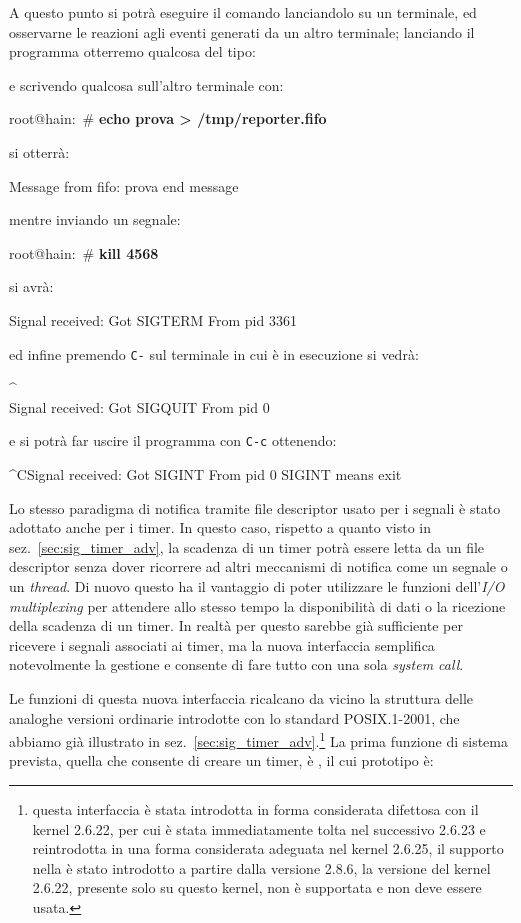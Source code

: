 A questo punto si potrà eseguire il comando lanciandolo su un terminale, ed
osservarne le reazioni agli eventi generati da un altro terminale; lanciando
il programma otterremo qualcosa del tipo:
e scrivendo qualcosa sull'altro terminale con:
\begin{Console}
root@hain:~# \textbf{echo prova > /tmp/reporter.fifo}  
\end{Console}
si otterrà:
\begin{Console}
Message from fifo:
prova
end message
\end{Console}
mentre inviando un segnale:
\begin{Console}
root@hain:~# \textbf{kill 4568}
\end{Console}
si avrà:
\begin{Console}
Signal received:
Got SIGTERM       
From pid 3361
\end{Console}
ed infine premendo \texttt{C-\bslash} sul terminale in cui è in esecuzione si
vedrà:
\begin{Console}
^\\Signal received:
Got SIGQUIT       
From pid 0
\end{Console}
e si potrà far uscire il programma con \texttt{C-c} ottenendo:
\begin{Console}
^CSignal received:
Got SIGINT        
From pid 0
SIGINT means exit
\end{Console}

Lo stesso paradigma di notifica tramite file descriptor usato per i segnali è
stato adottato anche per i timer. In questo caso, rispetto a quanto visto in
sez.~\ref{sec:sig_timer_adv}, la scadenza di un timer potrà essere letta da un
file descriptor senza dover ricorrere ad altri meccanismi di notifica come un
segnale o un \textit{thread}. Di nuovo questo ha il vantaggio di poter
utilizzare le funzioni dell'\textit{I/O multiplexing} per attendere allo
stesso tempo la disponibilità di dati o la ricezione della scadenza di un
timer. In realtà per questo sarebbe già sufficiente  per
ricevere i segnali associati ai timer, ma la nuova interfaccia semplifica
notevolmente la gestione e consente di fare tutto con una sola \textit{system
  call}.

Le funzioni di questa nuova interfaccia ricalcano da vicino la struttura delle
analoghe versioni ordinarie introdotte con lo standard POSIX.1-2001, che
abbiamo già illustrato in sez.~\ref{sec:sig_timer_adv}.\footnote{questa
  interfaccia è stata introdotta in forma considerata difettosa con il kernel
  2.6.22, per cui è stata immediatamente tolta nel successivo 2.6.23 e
  reintrodotta in una forma considerata adeguata nel kernel 2.6.25, il
  supporto nella  è stato introdotto a partire dalla versione
  2.8.6, la versione del kernel 2.6.22, presente solo su questo kernel, non è
  supportata e non deve essere usata.} La prima funzione di sistema prevista,
quella che consente di creare un timer, è , il cui
prototipo è:

